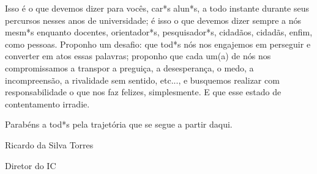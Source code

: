 Isso é o que devemos dizer para vocês, car*s alun*s, a todo instante durante
seus percursos nesses anos de universidade; é isso o que devemos dizer sempre a
nós mesm*s enquanto docentes, orientador*s, pesquisador*s, cidadãos, cidadãs, enfim, como
pessoas. Proponho um desafio: que tod*s nós nos engajemos em perseguir e
converter em atos essas palavras; proponho que cada um(a) de nós nos compromissamos
a transpor a preguiça, a desesperança, o medo, a incompreensão, a rivalidade sem
sentido, etc..., e busquemos realizar com responsabilidade o que nos faz
felizes, simplesmente. E que esse estado de contentamento irradie.

Parabéns a tod*s pela trajetória que se segue a partir daqui.

\begin{flushright}
Ricardo da Silva Torres

Diretor do IC

\end{flushright}
